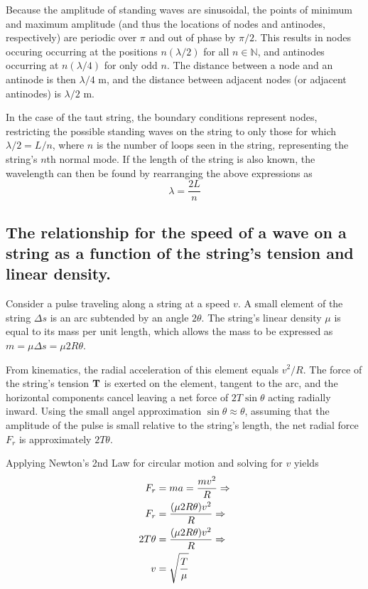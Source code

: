 \documentclass[twocolumn,english]{IEEEtran}
\theoremstyle{plain}
\theoremstyle{plain}
\begin{document}
Because the amplitude of standing waves are sinusoidal, the points of minimum and maximum amplitude (and thus the locations of nodes and antinodes, respectively) are periodic over $\pi$ and out of phase by $\pi/2$. This results in nodes occuring occurring at the positions $n(\lambda/2)$ for all $n \in \mathbb{N}$, and antinodes occurring at $n(\lambda/4)$ for only odd $n$. The distance between a node and an antinode is then $\lambda/4$ m, and the distance between adjacent nodes (or adjacent antinodes) is $\lambda/2$ m.

In the case of the taut string, the boundary conditions represent nodes, restricting the possible standing waves on the string to only those for which $\lambda/2 = L/n$, where $n$ is the number of loops seen in the string, representing the string's $n$th normal mode. If the length of the string is also known, the wavelength can then be found by rearranging the above expressions as
\begin{equation}\label{eq:p1_wavelength}
 \lambda = \frac{2L}{n}
\end{equation}

\subsection{The relationship for the speed of a wave on a string as a function of the string's tension and linear density.}
Consider a pulse traveling along a string at a speed $v$. A small element of the string $\Delta s$ is an arc subtended by an angle $2\theta$. The string's linear density $\mu$ is equal to its mass per unit length, which allows the mass to be expressed as $m = \mu\Delta s = \mu 2R\theta$.

From kinematics, the radial acceleration of this element equals $v^2/R$. The force of the string's tension $\bf{T}$ is exerted on the element, tangent to the arc, and the horizontal components cancel leaving a net force of $2T\sin\theta$ acting radially inward. Using the small angel approximation $\sin\theta \approx \theta$, assuming that the amplitude of the pulse is small relative to the string's length, the net radial force $F_r$ is approximately $2T\theta$.

Applying Newton's 2nd Law for circular motion and solving for $v$ yields
\begin{align}\label{eq:v.eq.t.mu}
 F_r &= ma = \frac{mv^2}{R} \Rightarrow \notag \\
 F_r &= \frac{(\mu 2R\theta)v^2}{R}  \Rightarrow \notag \\
 2T\theta &= \frac{(\mu 2R\theta)v^2}{R} \Rightarrow \notag \\
 v &= \sqrt{\frac{T}{\mu}}
\end{align}
\end{document}
